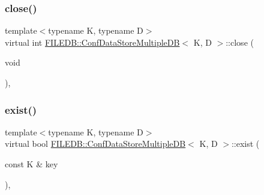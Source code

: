 \subsubsection{\texorpdfstring{close()}{close()}\hspace{0.1cm}{\footnotesize\ttfamily [2/2]}}
{\footnotesize\ttfamily template$<$typename K, typename D$>$ \\
virtual int \mbox{\hyperlink{classFILEDB_1_1ConfDataStoreMultipleDB}{F\+I\+L\+E\+D\+B\+::\+Conf\+Data\+Store\+Multiple\+DB}}$<$ K, D $>$\+::close (\begin{DoxyParamCaption}\item[{void}]{ }\end{DoxyParamCaption})\hspace{0.3cm}{\ttfamily [inline]}, {\ttfamily [virtual]}}

\mbox{\label{classFILEDB_1_1ConfDataStoreMultipleDB_ad80312a9a4767f3b0b567932542d3ee7}} 
\subsubsection{\texorpdfstring{exist()}{exist()}\hspace{0.1cm}{\footnotesize\ttfamily [1/2]}}
{\footnotesize\ttfamily template$<$typename K, typename D$>$ \\
virtual bool \mbox{\hyperlink{classFILEDB_1_1ConfDataStoreMultipleDB}{F\+I\+L\+E\+D\+B\+::\+Conf\+Data\+Store\+Multiple\+DB}}$<$ K, D $>$\+::exist (\begin{DoxyParamCaption}\item[{const K \&}]{key }\end{DoxyParamCaption})\hspace{0.3cm}{\ttfamily [inline]}, {\ttfamily [virtual]}}

